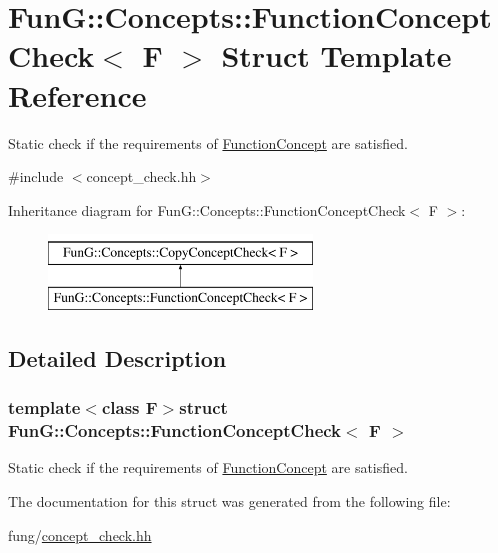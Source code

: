 \hypertarget{structFunG_1_1Concepts_1_1FunctionConceptCheck}{}\section{Fun\+G\+:\+:Concepts\+:\+:Function\+Concept\+Check$<$ F $>$ Struct Template Reference}
\label{structFunG_1_1Concepts_1_1FunctionConceptCheck}


Static check if the requirements of \hyperlink{structFunG_1_1Concepts_1_1FunctionConcept}{Function\+Concept} are satisfied.  




{\ttfamily \#include $<$concept\+\_\+check.\+hh$>$}

Inheritance diagram for Fun\+G\+:\+:Concepts\+:\+:Function\+Concept\+Check$<$ F $>$\+:\begin{figure}[H]
\begin{center}
\leavevmode
\includegraphics[height=2.000000cm]{structFunG_1_1Concepts_1_1FunctionConceptCheck}
\end{center}
\end{figure}


\subsection{Detailed Description}
\subsubsection*{template$<$class F$>$struct Fun\+G\+::\+Concepts\+::\+Function\+Concept\+Check$<$ F $>$}

Static check if the requirements of \hyperlink{structFunG_1_1Concepts_1_1FunctionConcept}{Function\+Concept} are satisfied. 

The documentation for this struct was generated from the following file\+:\begin{DoxyCompactItemize}
\item 
fung/\hyperlink{concept__check_8hh}{concept\+\_\+check.\+hh}\end{DoxyCompactItemize}
